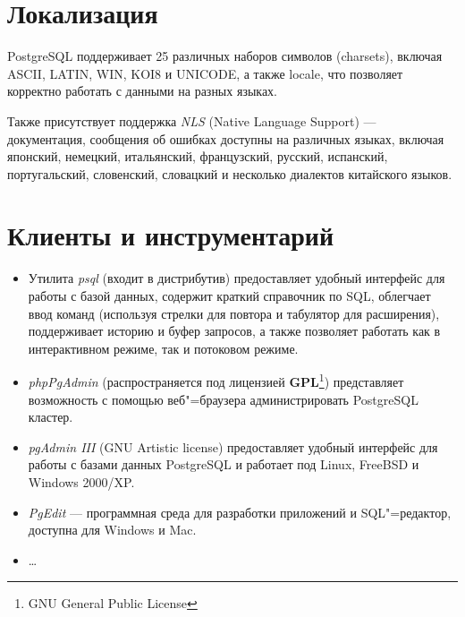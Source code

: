 \documentclass[a4paper,12pt,notitlepage,headsepline,pdftex]{scrartcl}
\begin{document}
\section{Локализация}
  PostgreSQL поддерживает 25 различных наборов символов (charsets), включая
  ASCII, LATIN, WIN, KOI8 и UNICODE, а также locale, что позволяет корректно
  работать с данными на разных языках.

  Также присутствует поддержка \emph{NLS} (Native Language Support) ---
  документация, сообщения об ошибках доступны на различных языках, включая
  японский, немецкий, итальянский, французский, русский, испанский,
  португальский, словенский, словацкий и несколько диалектов китайского
  языков.
  \pagebreak
\section{Клиенты и инструментарий}
  \begin{itemize}
    \item Утилита \emph{psql} (входит в дистрибутив) предоставляет удобный
      интерфейс для работы с базой данных, содержит краткий справочник по SQL,
      облегчает ввод команд (используя стрелки для повтора и табулятор для
      расширения), поддерживает историю и буфер запросов, а также позволяет
      работать как в интерактивном режиме, так и потоковом режиме.
    \item \emph{phpPgAdmin} (распространяется под лицензией
      \textbf{GPL}\footnote{GNU General Public License}) представляет
      возможность с помощью веб"=браузера администрировать PostgreSQL кластер.
    \item \emph{pgAdmin III} (GNU Artistic license) предоставляет удобный
      интерфейс для работы с базами данных PostgreSQL и работает под Linux,
      FreeBSD и Windows 2000/XP.
    \item \emph{PgEdit} --- программная среда для разработки приложений и
      SQL"=редактор, доступна для Windows и Mac.
    \item \ldots
  \end{itemize}\cite{wtfispg}
  \pagebreak



\end{document}
